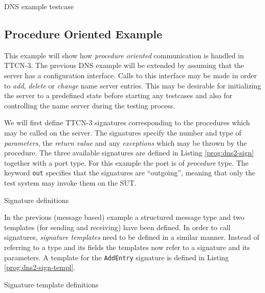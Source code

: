 \begin{program}
\caption{DNS example testcase\label{prog:dns-testcase}}
\end{program}


\subsection{Procedure Oriented Example}

This example will show
how \emph{procedure oriented} communication is handled in \ac{TTCN-3}.
The previous \ac{DNS} example will be extended
by assuming that the server has a configuration interface.
Calls to this interface may be made
in order to \emph{add}, \emph{delete} or \emph{change} name server entries.
This may be desirable for initializing the server to a predefined state
before starting any testcases
and also for controlling the name server during the testing process.

We will first define \ac{TTCN-3} signatures
corresponding to the procedures which may be called on the server.
The signatures specify the number and type of \emph{parameters},
the \emph{return value}
and any \emph{exceptions} which may be thrown by the procedure.
The three available signatures are defined in Listing \ref{prog:dns2-sign}
together with a port type.
For this example the port is of \emph{procedure} type.
The keyword \verb=out= specifies that the signatures are ``outgoing'',
meaning that only the test system may invoke them on the \ac{SUT}.

\begin{program}
\caption{Signature definitions\label{prog:dns2-sign}}
\end{program}

In the previous (message based) example a structured message type
and two templates (for sending and receiving) have been defined.
In order to call signatures, \emph{signature templates} need to be defined
in a similar manner.
Instead of referring to a type and its fields
the templates now refer to a signature and its parameters.
A template for the \verb=AddEntry= signature is defined
in Listing \ref{prog:dns2-sign-templ}.

\begin{program}
\caption{Signature template definitions\label{prog:dns2-sign-templ}}
\end{program}

